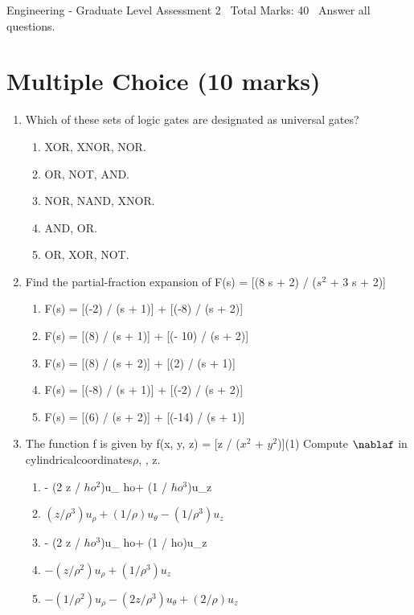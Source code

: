 \documentclass[12pt]{article}
\begin{document}
\begin{center}
Engineering - Graduate Level Assessment 2 \
Total Marks: 40 \
Answer all questions.
\end{center}

\section*{Multiple Choice (10 marks)}
\begin{enumerate}[label=\arabic*.]
\item Which of these sets of logic gates are designated as universal gates?
\begin{enumerate}[label=(\alph*)]
    \item XOR, XNOR, NOR.
    \item OR, NOT, AND.
    \item NOR, NAND, XNOR.
    \item AND, OR.
    \item OR, XOR, NOT.
\end{enumerate}
\item Find the partial-fraction expansion of F(s) = [(8 s + 2) / ($s^2$ + 3 s + 2)]
\begin{enumerate}[label=(\alph*)]
    \item F(s) = [(-2) / (s + 1)] + [(-8) / (s + 2)]
    \item F(s) = [(8) / (s + 1)] + [(- 10) / (s + 2)]
    \item F(s) = [(8) / (s + 2)] + [(2) / (s + 1)]
    \item F(s) = [(-8) / (s + 1)] + [(-2) / (s + 2)]
    \item F(s) = [(6) / (s + 2)] + [(-14) / (s + 1)]
\end{enumerate}
\item The function f is given by f(x, y, z) = [z / ($x^2$ + $y^2$)](1) Compute \ensuremath{\nablaf} in cylindricalcoordinates\ensuremath{\rho}, \texttheta, z.
\begin{enumerate}[label=(\alph*)]
    \item - (2 z / $ho^2$)u\_ ho+ (1 / $ho^3$)u\_z
    \item \( (z / \rho^3)u_\rho + (1 / \rho)u_\theta - (1 / \rho^3)u_z \)
    \item - (2 z / $ho^3$)u\_ ho+ (1 / ho)u\_z
    \item \( - (z / \rho^2)u_\rho + (1 / \rho^3)u_z \)
    \item \( - (1 / \rho^2)u_\rho - (2 z / \rho^3)u_\theta + (2 / \rho)u_z \)
\end{enumerate}

\end{enumerate}
\end{document}

